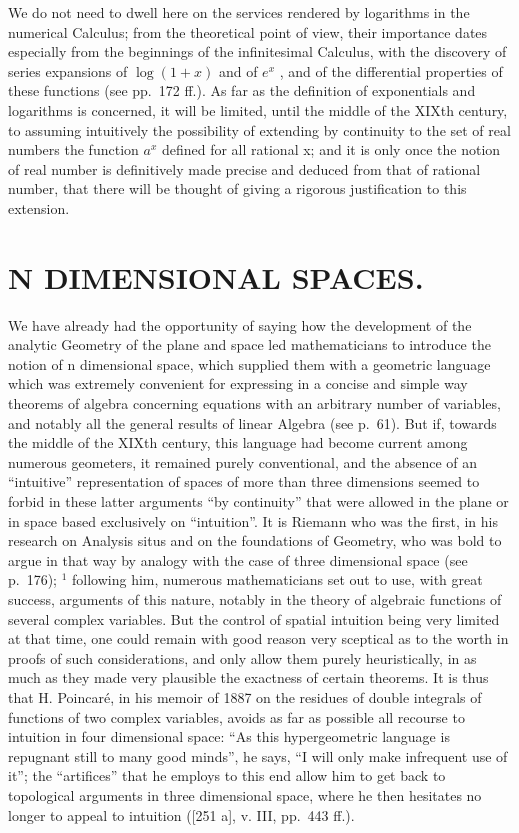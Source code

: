 We do not need to dwell here on the services rendered by logarithms in the numerical Calculus; from the theoretical point of view, their importance dates especially from the beginnings of the infinitesimal Calculus, with the discovery of series expansions of \(\log(1+x)\) and of \(e^{x}\) , and of the differential properties of these functions (see pp.~172 ff.). As far as the definition of exponentials and logarithms is concerned, it will be limited, until the middle of the XIXth century, to assuming intuitively the possibility of extending by continuity to the set of real numbers the function \(a^{x}\) defined for all rational x; and it is only once the notion of real number is definitively made precise and deduced from that of rational number, that there will be thought of giving a rigorous justification to this extension.

\chapter{N DIMENSIONAL SPACES.}

We have already had the opportunity of saying how the development of the analytic Geometry of the plane and space led mathematicians to introduce the notion of n dimensional space, which supplied them with a geometric language which was extremely convenient for expressing in a concise and simple way theorems of algebra concerning equations with an arbitrary number of variables, and notably all the general results of linear Algebra (see p.~61). But if, towards the middle of the XIXth century, this language had become current among numerous geometers, it remained purely conventional, and the absence of an ``intuitive'' representation of spaces of more than three dimensions seemed to forbid in these latter arguments ``by continuity'' that were allowed in the plane or in space based exclusively on ``intuition''. It is Riemann who was the first, in his research on Analysis situs and on the foundations of Geometry, who was bold to argue in that way by analogy with the case of three dimensional space (see p.~176); \(^{1}\) following him, numerous mathematicians set out to use, with great success, arguments of this nature, notably in the theory of algebraic functions of several complex variables. But the control of spatial intuition being very limited at that time, one could remain with good reason very sceptical as to the worth in proofs of such considerations, and only allow them purely heuristically, in as much as they made very plausible the exactness of certain theorems. It is thus that H. Poincaré, in his memoir of 1887 on the residues of double integrals of functions of two complex variables, avoids as far as possible all recourse to intuition in four dimensional space: ``As this hypergeometric language is repugnant still to many good minds'', he says, ``I will only make infrequent use of it''; the ``artifices'' that he employs to this end allow him to get back to topological arguments in three dimensional space, where he then hesitates no longer to appeal to intuition ({[}251 a{]}, v. III, pp.~443 ff.).

